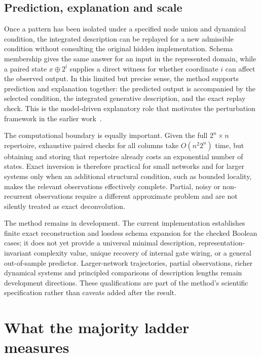 \documentclass[11pt,a4paper]{article}
\begin{document}
\subsection{Prediction, explanation and scale}

Once a pattern has been isolated under a specified node union and dynamical
condition, the integrated description can be replayed for a new admissible
condition without consulting the original hidden implementation. Schema
membership gives the same answer for an input in the represented domain,
while a paired state $x\mathbin{\oplus}2^i$ supplies a direct witness for
whether coordinate $i$ can affect the observed output. In this limited but
precise sense, the method supports prediction and explanation together: the
predicted output is accompanied by the selected condition, the integrated
generative description, and the exact replay check. This is the model-driven
explanatory role that motivates the perturbation framework in the earlier
work~\cite{hernandez2019aid,hernandez2021aid,zenil2019calculus,
zenil2019deconvolution}.

The computational boundary is equally important. Given the full
$2^n\times n$ repertoire, exhaustive paired checks for all columns take
$O(n^2 2^n)$ time, but obtaining and storing that repertoire already costs an
exponential number of states. Exact inversion is therefore practical for
small networks and for larger systems only when an additional structural
condition, such as bounded locality, makes the relevant observations
effectively complete. Partial, noisy or non-recurrent observations require a
different approximate problem and are not silently treated as exact
deconvolution.

The method remains in development. The current implementation establishes
finite exact reconstruction and lossless schema expansion for the checked
Boolean cases; it does not yet provide a universal minimal description,
representation-invariant complexity value, unique recovery of internal gate
wiring, or a general out-of-sample predictor. Larger-network trajectories,
partial observations, richer dynamical systems and principled comparisons of
description lengths remain development directions. These qualifications are
part of the method's scientific specification rather than caveats added after
the result.

\section{What the majority ladder measures}
\label{sec:ladder-scope}
\end{document}
